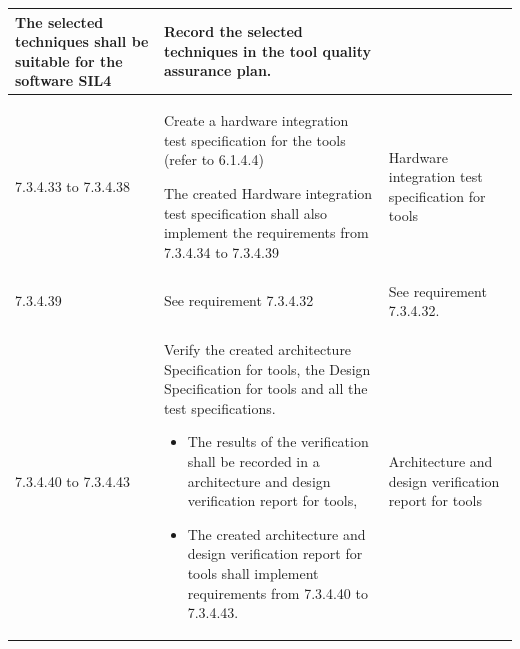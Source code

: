 \documentclass{template/openetcs_report}
\begin{document}
{\begin{longtable}{|p{2cm}|p{9cm}|p{3cm}|}
The selected techniques shall be suitable for the software SIL4
& Record the selected techniques in the tool quality assurance plan.\\ 
\hline
7.3.4.33 to 7.3.4.38 & Create a hardware integration test specification for the tools (refer to 6.1.4.4)

The created Hardware integration test specification shall also implement the requirements from 7.3.4.34 to 7.3.4.39
& Hardware integration test specification for tools\\ 
\hline
7.3.4.39 & See requirement 7.3.4.32 & See requirement 7.3.4.32.\\ 
\hline
7.3.4.40 to 7.3.4.43 & Verify the created architecture Specification for tools, the Design Specification for tools and all the test specifications.
\begin{itemize}\itemsep=0pt
  \item The results of the verification shall be recorded in a architecture and design verification report for tools,
  \item The created architecture and design verification report for tools shall implement requirements from 7.3.4.40 to 7.3.4.43. 
\end{itemize}
& Architecture and design verification report for tools\\ 
\hline
\end{longtable}}
\end{document}
